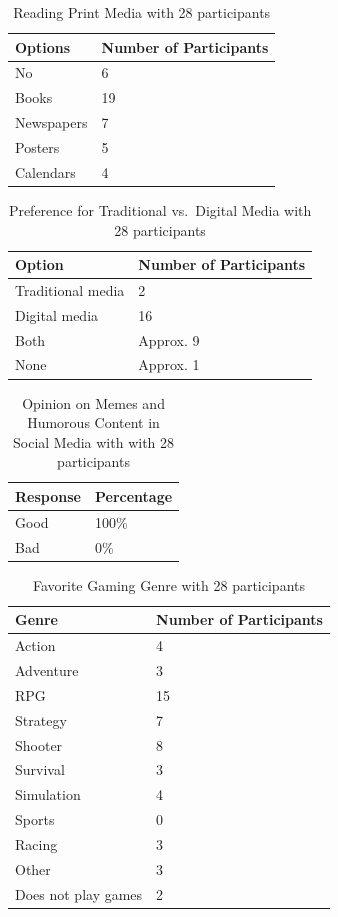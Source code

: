 \documentclass{article}
\begin{document}
\begin{longtable}[]{@{}ll@{}}
\caption{Reading Print Media with 28 participants} \label{reading-print-media} \\
\toprule\noalign{}
Options & Number of Participants \\
\midrule\noalign{}
\endhead
\bottomrule\noalign{}
\endlastfoot
No & 6 \\
Books & 19 \\
Newspapers & 7 \\
Posters & 5 \\
Calendars & 4 \\
\end{longtable}

\begin{longtable}[]{@{}ll@{}}
\caption{Preference for Traditional vs.~Digital Media with 28 participants} \label{preference-for-traditional-vs.-digital-media} \\
\toprule\noalign{}
Option & Number of Participants \\
\midrule\noalign{}
\endhead
\bottomrule\noalign{}
\endlastfoot
Traditional media & 2 \\
Digital media & 16 \\
Both & Approx. 9 \\
None & Approx. 1 \\
\end{longtable}

\begin{longtable}[]{@{}ll@{}}
\caption{Opinion on Memes and Humorous Content in Social Media with with 28 participants} \label{opinion-on-memes-and-humorous-content-in-social-media} \\
\toprule\noalign{}
Response & Percentage \\
\midrule\noalign{}
\endhead
\bottomrule\noalign{}
\endlastfoot
Good & 100\% \\
Bad & 0\% \\
\end{longtable}

\begin{longtable}[]{@{}ll@{}}
\caption{Favorite Gaming Genre with 28 participants} \label{favorite-gaming-genre} \\
\toprule\noalign{}
Genre & Number of Participants \\
\midrule\noalign{}
\endhead
\bottomrule\noalign{}
\endlastfoot
Action & 4 \\
Adventure & 3 \\
RPG & 15 \\
Strategy & 7 \\
Shooter & 8 \\
Survival & 3 \\
Simulation & 4 \\
Sports & 0 \\
Racing & 3 \\
Other & 3 \\
Does not play games & 2 \\
\end{longtable}
\end{document}
